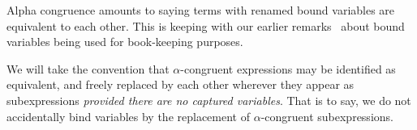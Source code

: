\begin{node}[Syntax]
\begin{definition}
\begin{node}\label{untyped-lambda-000G}%
Alpha congruence amounts to saying terms with renamed bound variables
are equivalent to each other. This is keeping with our earlier
remarks~ about bound variables being used for
book-keeping purposes.
\end{node}

\begin{node}[Convention]\label{untyped-lambda-000H}%
We will take the convention that $\alpha$-congruent expressions may be
identified as equivalent, and freely replaced by each other wherever
they appear as subexpressions \emph{provided there are no captured variables}. 
That is to say, we do not accidentally bind variables by the replacement
of $\alpha$-congruent subexpressions.
\end{node}
\end{definition}


\end{node}

